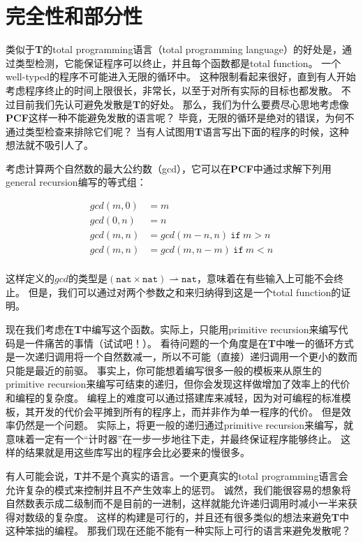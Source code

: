 \section{完全性和部分性}

类似于\textbf{T}的\gls{total programming}语言（total programming language）的好处是，通过类型检测，它能保证程序可以终止，并且每个函数都是\gls{total function}。
一个\gls{well-typed}的程序不可能进入无限的循环中。
这种限制看起来很好，直到有人开始考虑程序终止的时间上限很长，非常长，以至于对所有实际的目标也都发散。
不过目前我们先认可避免发散是\textbf{T}的好处。
那么，我们为什么要费尽心思地考虑像\textbf{PCF}这样一种不能避免发散的语言呢？
毕竟，无限的循环是绝对的错误，为何不通过类型检查来排除它们呢？
当有人试图用\textbf{T}语言写出下面的程序的时候，这种想法就不吸引人了。

考虑计算两个自然数的最大公约数（gcd），它可以在\textbf{PCF}中通过求解下列用\gls{general recursion}编写的等式组：

\begin{align*}
	gcd(m, 0) &= m \\
	gcd(0, n) &= n \\
	gcd(m, n) &= gcd(m - n, n)\ \mathtt{if}\ m > n \\
	gcd(m, n) &= gcd(m, n - m)\ \mathtt{if}\ m < n \\
\end{align*}

这样定义的\(gcd\)的类型是\((\mathtt{nat} \times \mathtt{nat}) \rightharpoonup \mathtt{nat}\)，意味着在有些输入上可能不会终止。
但是，我们可以通过对两个参数之和来归纳得到这是一个\gls{total function}的证明。

现在我们考虑在\textbf{T}中编写这个函数。实际上，只能用\gls{primitive recursion}来编写代码是一件痛苦的事情（试试吧！）。
看待问题的一个角度是在\textbf{T}中唯一的循环方式是一次递归调用将一个自然数减一，所以不可能（直接）递归调用一个更小的数而只能是最近的前驱。
事实上，你可能想着编写很多一般的模板来从原生的\gls{primitive recursion}来编写可结束的递归，但你会发现这样做增加了效率上的代价和编程的复杂度。
编程上的难度可以通过搭建库来减轻，因为对可编程的标准模板，其开发的代价会平摊到所有的程序上，而并非作为单一程序的代价。
但是效率仍然是一个问题。
实际上，将更一般的递归通过\gls{primitive recursion}来编写，就意味着一定有一个“计时器”在一步一步地往下走，并最终保证程序能够终止。
这样的结果就是用这些库写出的程序会比必要来的慢很多。

有人可能会说，\textbf{T}并不是个真实的语言。一个更真实的\gls{total programming}语言会允许复杂的模式来控制并且不产生效率上的惩罚。
诚然，我们能很容易的想象将自然数表示成二级制而不是目前的一进制，这样就能允许递归调用时减小一半来获得对数级的复杂度。
这样的构建是可行的，并且还有很多类似的想法来避免\textbf{T}中这种笨拙的编程。
那我们现在还能不能有一种实际上可行的语言来避免发散呢？

